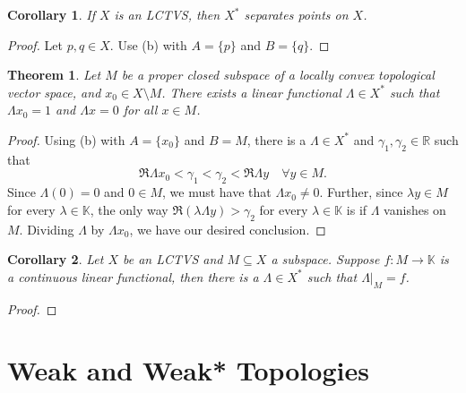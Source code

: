 \documentclass[11pt]{article}
\theoremstyle{thmstyle}
\newtheorem{theorem}{Theorem}[section]
\theoremstyle{defstyle}
\newtheorem*{corollary}{Corollary}
\newcommand{\R}{\mathbb{R}}
\newcommand{\bbC}{\mathbb{C}}
\newcommand{\K}{\mathbb{K}} %
\begin{document}
\begin{corollary}
    If $X$ is an LCTVS, then $X^\ast$ separates points on $X$.
\end{corollary}
\begin{proof}
    Let $p, q\in X$. Use  (b) with $A = \{p\}$ and $B = \{q\}$.
\end{proof}

\begin{theorem}
    Let $M$ be a proper closed subspace of a locally convex topological vector space, and $x_0\in X\setminus M$. There exists a linear functional $\Lambda\in X^\ast$ such that $\Lambda x_0 = 1$ and $\Lambda x = 0$ for all $x\in M$.
\end{theorem}
\begin{proof}
    Using (b) with $A = \{x_0\}$ and $B = M$, there is a $\Lambda\in X^\ast$ and $\gamma_1,\gamma_2\in\R$ such that 
    \begin{equation*}
        \Re\Lambda x_0 < \gamma_1 < \gamma_2 < \Re\Lambda y\quad\forall y\in M.
    \end{equation*}
    Since $\Lambda(0) = 0$ and $0\in M$, we must have that $\Lambda x_0\ne 0$. Further, since $\lambda y\in M$ for every $\lambda\in\K$, the only way $\Re(\lambda\Lambda y) > \gamma_2$ for every $\lambda\in\K$ is if $\Lambda$ vanishes on $M$. Dividing $\Lambda$ by $\Lambda x_0$, we have our desired conclusion.
\end{proof}

\begin{corollary}
    Let $X$ be an LCTVS and $M\subseteq X$ a subspace. Suppose $f: M\to\K$ is a continuous linear functional, then there is a $\Lambda\in X^\ast$ such that $\Lambda|_M = f$.
\end{corollary}
\begin{proof}
\end{proof}

\section{Weak and Weak* Topologies}
\end{document}
